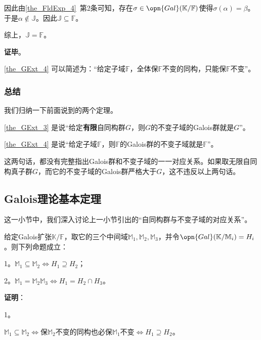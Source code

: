 因此由\autoref{the_FldExp_4}~第2条可知，存在$\sigma\in\opn{Gal}(\mathbb{K}/\mathbb{F})$使得$\sigma(\alpha)=\beta$。于是$\alpha\not\in \mathbb{J}$。因此$\mathbb{J}\subseteq\mathbb{F}$。

综上，$\mathbb{J}=\mathbb{F}$。

\textbf{证毕}。


\autoref{the_GExt_4} 可以简述为：“给定子域$\mathbb{F}$，全体保$\mathbb{F}$不变的同构，只能保$\mathbb{F}$不变”。




\subsubsection{总结}

我们归纳一下前面说到的两个定理。

\autoref{the_GExt_3} 是说“给定\textbf{有限}自同构群$G$，则$G$的不变子域的Galois群就是$G$”。

\autoref{the_GExt_4} 是说“给定子域$\mathbb{F}$，则$\mathbb{F}$的Galois群的不变子域就是$\mathbb{F}$”。


这两句话，都没有完整指出Galois群和不变子域的一一对应关系。如果取无限自同构真子群$G$，而它的不变子域的Galois群严格大于$G$，这不违反以上两句话。








\subsection{Galois理论基本定理}\label{sub_GExt_1}

这一小节中，我们深入讨论上一小节引出的“自同构群与不变子域的对应关系”。


\begin{lemma}{}\label{lem_GExt_1}
给定Galois扩张$\mathbb{K}/\mathbb{F}$，取它的三个中间域$\mathbb{M}_1, \mathbb{M}_2, \mathbb{M}_3$，并令$\opn{Gal}(\mathbb{K}/\mathbb{M}_i)=H_i$。则下列命题成立：

1。$\mathbb{M}_1\subseteq \mathbb{M}_2 \iff H_1\supseteq H_2$；

2。$\mathbb{M}_1=\mathbb{M}_2\mathbb{M}_3 \iff H_1=H_2\cap H_3$。
\end{lemma}

\textbf{证明}：

1。

$\mathbb{M}_1\subseteq\mathbb{M}_2 \iff$保$\mathbb{M}_2$不变的同构也必保$\mathbb{M}_1$不变$\iff H_1\supseteq H_2$。

